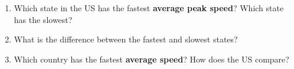 \begin{enumerate}
\item Which state in the US has the fastest \textbf{average peak speed}? Which state has the slowest?
\par{}

\item What is the difference between the fastest and slowest states?
\par{}

\item Which country has the fastest \textbf{average speed}? How does the US compare?
\par{}
\end{enumerate}
